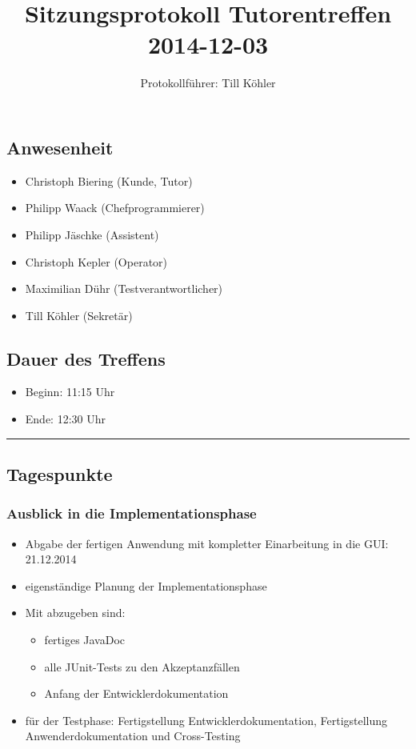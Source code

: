 \documentclass[12pt,a4paper]{article}
\author{Protokollführer: Till Köhler}
\title{Sitzungsprotokoll Tutorentreffen 2014-12-03}
\date{}
\begin{document}
\maketitle

\subsection*{Anwesenheit}
\medskip
\begin{itemize}
\item Christoph Biering (Kunde, Tutor)
\item Philipp Waack (Chefprogrammierer)
\item Philipp Jäschke (Assistent)
\item Christoph Kepler (Operator)
\item Maximilian Dühr (Testverantwortlicher)
\item Till Köhler (Sekretär)
\end{itemize}

\subsection*{Dauer des Treffens}
\medskip
\begin{itemize}
\item Beginn: 11:15 Uhr
\item Ende: 12:30 Uhr
\end{itemize}

\noindent\rule{\textwidth}{1pt}

\subsection*{Tagespunkte}
\medskip

\subsubsection*{Ausblick in die Implementationsphase}
\begin{itemize}
\item Abgabe der fertigen Anwendung mit kompletter Einarbeitung in die GUI: 21.12.2014
\item eigenständige Planung der Implementationsphase
\item Mit abzugeben sind:
\begin{itemize}
\item fertiges JavaDoc
\item alle JUnit-Tests zu den Akzeptanzfällen
\item Anfang der Entwicklerdokumentation
\end{itemize}
\item für der Testphase: Fertigstellung Entwicklerdokumentation, Fertigstellung Anwenderdokumentation und Cross-Testing
\end{itemize}
\end{document}

